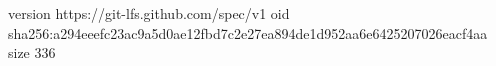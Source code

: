 version https://git-lfs.github.com/spec/v1
oid sha256:a294eeefc23ac9a5d0ae12fbd7c2e27ea894de1d952aa6e6425207026eacf4aa
size 336

